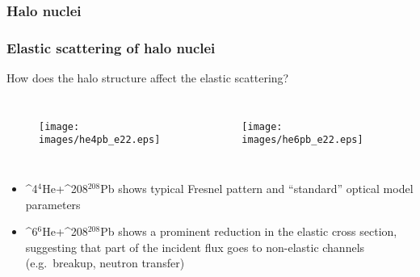 \documentclass[english,10pt]{beamer}
\newcommand{\slide}[1]{\begin{frame} \frametitle{ #1}}
\newcommand{\images}{images}
\def\nuc#1#2{\relax\ifmmode{}^{#1}{\protect\text{#2}}\else${}^{#1}$#2\fi}
\begin{document}
\subsubsection{Halo nuclei}

\slide{Elastic scattering of halo nuclei}

{\verde How does the halo structure affect the elastic scattering?}
\vspace{0.3cm}


\begin{columns}
\begin{figure}{\par \resizebox*{0.7\textwidth}{!}
{\texttt{[image: \\images/he4pb\_e22.eps]}} \par}
\end{figure}
\begin{figure}{\par \resizebox*{0.7\textwidth}{!}
{\texttt{[image: \\images/he6pb\_e22.eps]}} \par}
\end{figure}
\end{columns}
\bigskip

\begin{small}
\begin{itemize}
\item \nuc{4}{He}+\nuc{208}{Pb} shows typical Fresnel pattern and ``standard'' optical model parameters
\item \nuc{6}{He}+\nuc{208}{Pb} shows a prominent reduction in the elastic cross section, suggesting that part of the incident flux goes to non-elastic channels (e.g.~breakup, neutron transfer) 
\end{itemize}
\end{small}
\end{frame}
\end{document}

